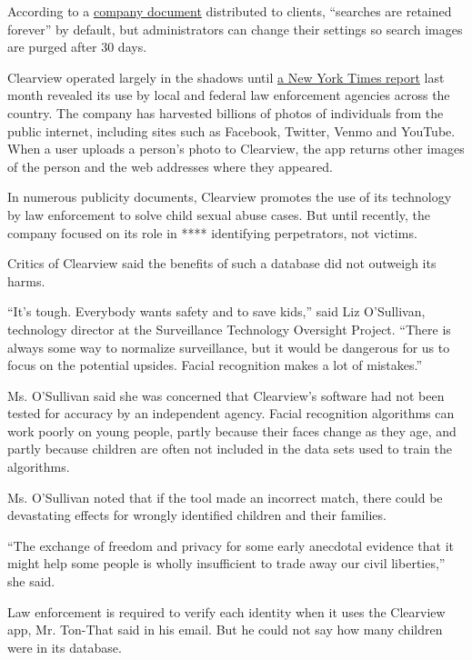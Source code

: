 According to a
\href{https://int.graylady3jvrrxbe.onion/data/documenthelper/6690-clearview-faq/c8b081a0bcca12e7903a/optimized/full.pdf\#page=1}{company
document} distributed to clients, ``searches are retained forever'' by
default, but administrators can change their settings so search images
are purged after 30 days.

Clearview operated largely in the shadows until
\href{https://www.nytimes3xbfgragh.onion/2020/01/18/technology/clearview-privacy-facial-recognition.html}{a
New York Times report} last month revealed its use by local and federal
law enforcement agencies across the country. The company has harvested
billions of photos of individuals from the public internet, including
sites such as Facebook, Twitter, Venmo and YouTube. When a user uploads
a person's photo to Clearview, the app returns other images of the
person and the web addresses where they appeared.

In numerous publicity documents, Clearview promotes the use of its
technology by law enforcement to solve child sexual abuse cases. But
until recently, the company focused on its role in **** identifying
perpetrators, not victims.

Critics of Clearview said the benefits of such a database did not
outweigh its harms.

``It's tough. Everybody wants safety and to save kids,'' said Liz
O'Sullivan, technology director at the Surveillance Technology Oversight
Project. ``There is always some way to normalize surveillance, but it
would be dangerous for us to focus on the potential upsides. Facial
recognition makes a lot of mistakes.''

Ms. O'Sullivan said she was concerned that Clearview's software had not
been tested for accuracy by an independent agency. Facial recognition
algorithms can work poorly on young people, partly because their faces
change as they age, and partly because children are often not included
in the data sets used to train the algorithms.

Ms. O'Sullivan noted that if the tool made an incorrect match, there
could be devastating effects for wrongly identified children and their
families.

``The exchange of freedom and privacy for some early anecdotal evidence
that it might help some people is wholly insufficient to trade away our
civil liberties,'' she said.

Law enforcement is required to verify each identity when it uses the
Clearview app, Mr. Ton-That said in his email. But he could not say how
many children were in its database.

